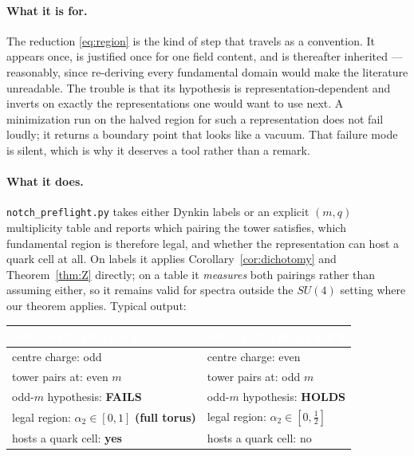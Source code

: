 \documentclass[11pt,a4paper]{article}
\begin{document}
\paragraph{What it is for.} The reduction \eqref{eq:region} is the kind of step that travels
as a convention. It appears once, is justified once for one field content, and is thereafter
inherited --- reasonably, since re-deriving every fundamental domain would make the
literature unreadable. The trouble is that its hypothesis is representation-dependent and
inverts on exactly the representations one would want to use next. A minimization run on the
halved region for such a representation does not fail loudly; it returns a boundary point
that looks like a vacuum. That failure mode is silent, which is why it deserves a tool
rather than a remark.

\paragraph{What it does.} \texttt{notch\_preflight.py} takes either Dynkin labels or an
explicit $(m,q)$ multiplicity table and reports which pairing the tower satisfies, which
fundamental region is therefore legal, and whether the representation can host a quark cell
at all. On labels it applies Corollary~\ref{cor:dichotomy} and Theorem~\ref{thm:Z} directly;
on a table it \emph{measures} both pairings rather than assuming either, so it remains valid
for spectra outside the $SU(4)$ setting where our theorem applies. Typical output:

\begin{center}\small
\begin{tabular}{ll}
\toprule
\rowcolor{hdrblue}
\textcolor{white}{\texttt{notch\_preflight.py 0 2 1}} & \textcolor{white}{\texttt{notch\_preflight.py 4 0 0}}\\
\midrule
centre charge: odd & centre charge: even\\
\rowcolor{softgrey}
tower pairs at: even $m$ & tower pairs at: odd $m$\\
odd-$m$ hypothesis: \textcolor{warmred}{\textbf{FAILS}} & odd-$m$ hypothesis: \textcolor{okgreen}{\textbf{HOLDS}}\\
\rowcolor{softgrey}
legal region: $\alpha_2\in[0,1]$ \textbf{(full torus)} & legal region: $\alpha_2\in[0,\tfrac12]$\\
hosts a quark cell: \textbf{yes} & hosts a quark cell: no\\
\bottomrule
\end{tabular}
\end{center}
\end{document}
